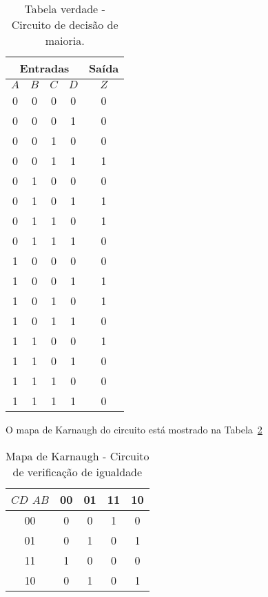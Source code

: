 \documentclass[12pt]{article}
\begin{document}
\begin{table}[H]
    \centering
    \caption{Tabela verdade - Circuito de decisão de maioria.}

    \begin{tabular}{|c|c|c|c|c|}
    \hline
    \multicolumn{4}{c}{Entradas} & \multicolumn{1}{|c|}{Saída}\\
    \hline
    $A$ & $B$ & $C$ & $D$ & $Z$\\
    \hline
    0 & 0 & 0 & 0 & 0\\
    \hline
    0 & 0 & 0 & 1 & 0\\
    \hline
    0 & 0 & 1 & 0 & 0\\
    \hline
    0 & 0 & 1 & 1 & 1\\
    \hline
    0 & 1 & 0 & 0 & 0\\
    \hline
    0 & 1 & 0 & 1 & 1\\
    \hline
    0 & 1 & 1 & 0 & 1\\
    \hline
    0 & 1 & 1 & 1 & 0\\
    \hline
    1 & 0 & 0 & 0 & 0\\
    \hline
    1 & 0 & 0 & 1 & 1\\
    \hline
    1 & 0 & 1 & 0 & 1\\
    \hline
    1 & 0 & 1 & 1 & 0\\
    \hline
    1 & 1 & 0 & 0 & 1\\
    \hline
    1 & 1 & 0 & 1 & 0\\
    \hline
    1 & 1 & 1 & 0 & 0\\
    \hline
    1 & 1 & 1 & 1 & 0\\
    \hline
    \end{tabular}
    \label{tab:circ_igual}
\end{table}

O mapa de Karnaugh do circuito está mostrado na Tabela~\ref{tab:k_map_circ_igual}

\begin{table}[H]
    \centering
    \caption{Mapa de Karnaugh - Circuito de verificação de igualdade}

    \begin{tabular}{|c|c|c|c|c|}
    \hline
    $C$$D$ $A$$B$ & 00 & 01 & 11 & 10\\
    \hline
    00 & 0 & 0 & 1 & 0\\
    \hline
    01 & 0 & 1 & 0 & 1\\
    \hline
    11 & 1 & 0 & 0 & 0\\
    \hline
    10 & 0 & 1 & 0 & 1\\
    \hline
    \end{tabular}
    \label{tab:k_map_circ_igual}
\end{table}
\end{document}
